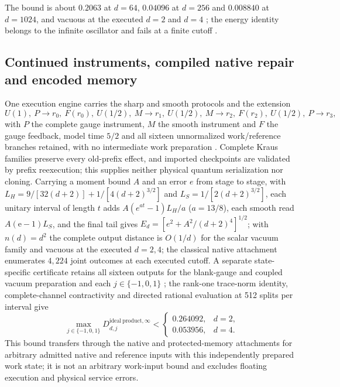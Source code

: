 \documentclass[11pt]{article}
\theoremstyle{definition}
\theoremstyle{remark}
\theoremstyle{plain}
\begin{document}
The bound is about $0.2063$ at $d=64$, $0.04096$ at $d=256$ and $0.008840$ at
$d=1024$, and vacuous at the executed $d=2$ and $d=4$ \cite{csREADME}; the
energy identity belongs to the infinite oscillator and fails at a finite
cutoff \cite{csSMOOTH,csCALIB}.

\subsection{Continued instruments, compiled native repair and encoded memory}
\label{sec:continued-native}

One execution engine carries the sharp and smooth protocols and the
extension
\[
 U(1),\ P\to r_0,\ F(r_0),\ U(1/2),\ M\to r_1,\
 U(1/2),\ M\to r_2,\ F(r_2),\ U(1/2),\ P\to r_3,
\]
with $P$ the complete gauge instrument, $M$ the smooth instrument and $F$
the gauge feedback, model time $5/2$ and all sixteen unnormalized
work/reference branches retained, with no intermediate work preparation
\cite{csCOMPOSE}. Complete Kraus families preserve every old-prefix effect,
and imported checkpoints are validated by prefix reexecution; this supplies
neither physical quantum serialization nor cloning. Carrying a moment bound
$A$ and an error $e$ from stage to stage, with
$L_H=9/[32(d+2)]+1/[4(d+2)^{3/2}]$ and $L_S=1/[2(d+2)^{3/2}]$, each unitary
interval of length $t$ adds $A(e^{at}-1)L_H/a$ ($a=13/8$), each smooth read
$A(\mathrm e-1)L_S$, and the final tail gives
$E_d=[e^2+A^2/(d+2)^4]^{1/2}$; with $n(d)=d^2$ the complete output distance
is $O(1/d)$ for the scalar vacuum family and vacuous at the executed $d=2,4$;
the classical native attachment enumerates $4{,}224$ joint outcomes at each
executed cutoff. A separate state-specific
certificate retains all sixteen outputs for the blank-gauge and coupled
vacuum preparation and each $j\in\{-1,0,1\}$ \cite{csSMOOTHHISTORY}; the
rank-one trace-norm identity, complete-channel contractivity and directed
rational evaluation at 512 splits per interval give
\[
 \max_{j\in\{-1,0,1\}}D_{d,j}^{\mathrm{ideal\ product},\infty}
 <\begin{cases}0.264092,&d=2,\\0.053956,&d=4.\end{cases}
\]
This bound transfers through the native and protected-memory attachments for
arbitrary admitted native and reference inputs with this independently
prepared work state; it is not an arbitrary work-input bound and excludes
floating execution and physical service errors.
\end{document}
